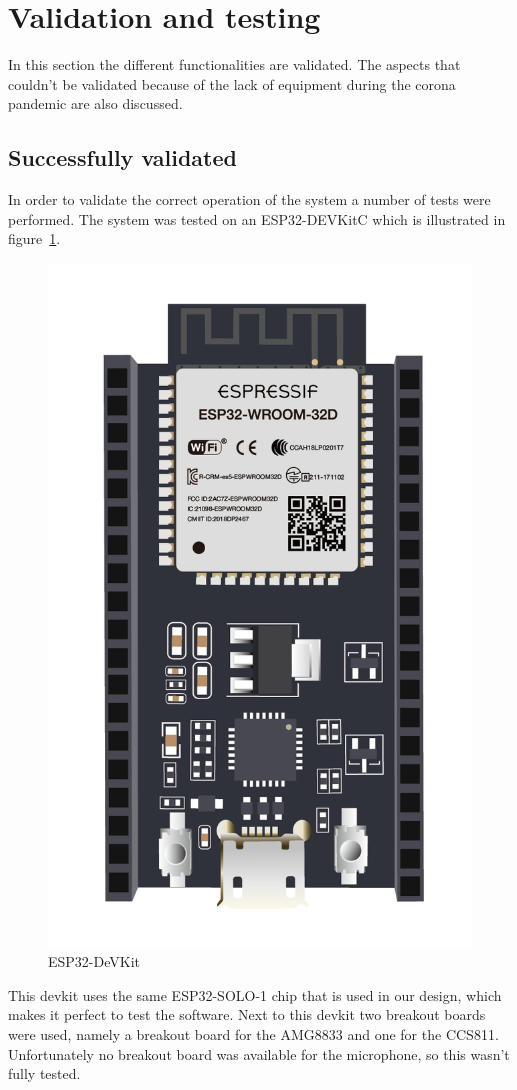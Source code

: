 \documentclass[11pt,a4paper]{article}
\begin{document}
\section{Validation and testing}
In this section the different functionalities are validated. The aspects that couldn't be validated because of the lack of equipment during the corona pandemic are also discussed. 
\subsection{Successfully validated}
In order to validate the correct operation of the system a number of tests were performed. The system was tested on an ESP32-DEVKitC which is illustrated in figure~\ref{fig:devkit}.
\begin{figure}[H]
	\centering
	\includegraphics[angle=90,width=0.8\linewidth]{devkit.png}
	\caption{ESP32-DeVKit~\cite{devkit}}
	\label{fig:devkit}
\end{figure}
This devkit uses the same ESP32-SOLO-1 chip that is used in our design, which makes it perfect to test the software. Next to this devkit two breakout boards were used, namely a breakout board for the AMG8833 and one for the CCS811. Unfortunately no breakout board was available for the microphone, so this wasn't fully tested. 
\end{document}
